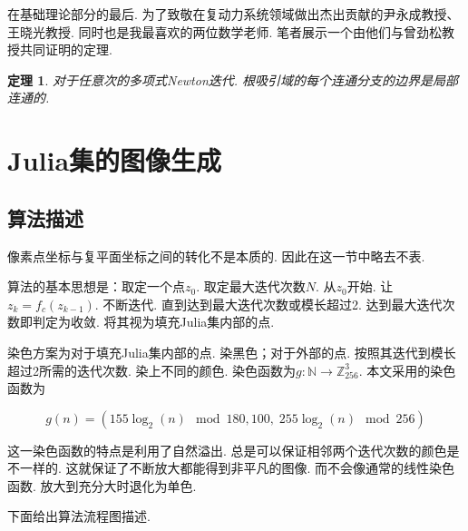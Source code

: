 \documentclass[UTF8]{ctexart}
\newtheorem{theorem}{定理}[section]  %
\begin{document}
在基础理论部分的最后. 为了致敬在复动力系统领域做出杰出贡献的尹永成教授、王晓光教授. 同时也是我最喜欢的两位数学老师. 笔者展示一个由他们与曾劲松教授共同证明的定理.

\begin{theorem}
    对于任意次的多项式Newton迭代. 根吸引域的每个连通分支的边界是局部连通的. 
\end{theorem}

\section{Julia集的图像生成}

\subsection{算法描述}

像素点坐标与复平面坐标之间的转化不是本质的. 因此在这一节中略去不表. 

算法的基本思想是：取定一个点$z_0$. 取定最大迭代次数$N$. 从$z_0$开始. 让$z_k=f_c(z_{k-1})$. 不断迭代. 直到达到最大迭代次数或模长超过2. 达到最大迭代次数即判定为收敛. 将其视为填充Julia集内部的点. 

染色方案为对于填充Julia集内部的点. 染黑色；对于外部的点. 按照其迭代到模长超过2所需的迭代次数. 染上不同的颜色. 染色函数为$g:\mathbb{N}\to\mathbb{Z}_{256}^3$. 本文采用的染色函数为

\begin{equation*}
    g(n)=(155\log_2(n)\mod 180,100,\;255\log_2(n)\mod 256)
\end{equation*}

这一染色函数的特点是利用了自然溢出. 总是可以保证相邻两个迭代次数的颜色是不一样的. 这就保证了不断放大都能得到非平凡的图像. 而不会像通常的线性染色函数. 放大到充分大时退化为单色. 

下面给出算法流程图描述. 
\end{document}
